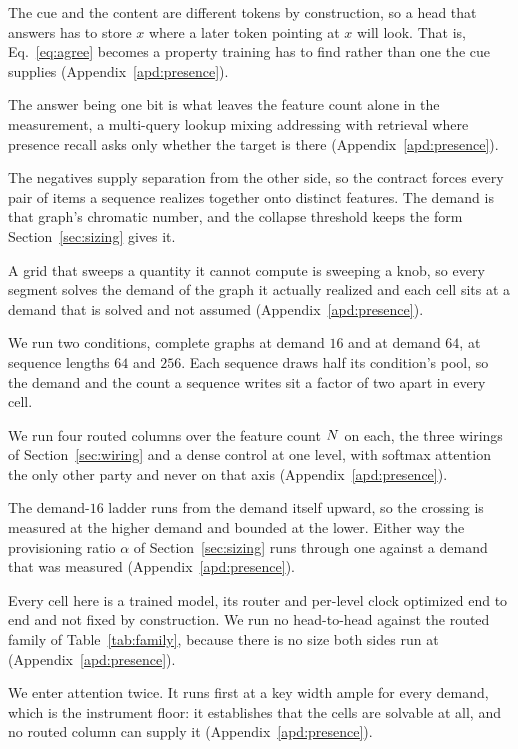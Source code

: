 The cue and the content are different tokens by construction, so a head that answers has to store $x$ where a later token pointing at $x$ will look. That is, Eq.~\eqref{eq:agree} becomes a property training has to find rather than one the cue supplies (Appendix~\ref{apd:presence}).

The answer being one bit is what leaves the feature count alone in the measurement, a multi-query lookup mixing addressing with retrieval where presence recall asks only whether the target is there (Appendix~\ref{apd:presence}).

The negatives supply separation from the other side, so the contract forces every pair of items a sequence realizes together onto distinct features. The demand is that graph's chromatic number, and the collapse threshold keeps the form Section~\ref{sec:sizing} gives it.

A grid that sweeps a quantity it cannot compute is sweeping a knob, so every segment solves the demand of the graph it actually realized and each cell sits at a demand that is solved and not assumed (Appendix~\ref{apd:presence}).



We run two conditions, complete graphs at demand $16$ and at demand $64$, at sequence lengths $64$ and $256$. Each sequence draws half its condition's pool, so the demand and the count a sequence writes sit a factor of two apart in every cell.

We run four routed columns over the feature count $N$ on each, the three wirings of Section~\ref{sec:wiring} and a dense control at one level, with softmax attention the only other party and never on that axis (Appendix~\ref{apd:presence}).

The demand-$16$ ladder runs from the demand itself upward, so the crossing is measured at the higher demand and bounded at the lower. Either way the provisioning ratio $\alpha$ of Section~\ref{sec:sizing} runs through one against a demand that was measured (Appendix~\ref{apd:presence}).

Every cell here is a trained model, its router and per-level clock optimized end to end and not fixed by construction. We run no head-to-head against the routed family of Table~\ref{tab:family}, because there is no size both sides run at (Appendix~\ref{apd:presence}).

We enter attention twice. It runs first at a key width ample for every demand, which is the instrument floor: it establishes that the cells are solvable at all, and no routed column can supply it (Appendix~\ref{apd:presence}).

